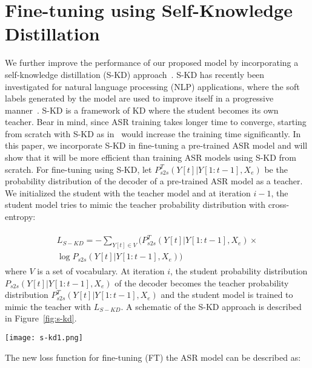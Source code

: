\documentclass{article}
\begin{document}
\section{Fine-tuning using Self-Knowledge Distillation}
We further improve the performance of our proposed model by incorporating a self-knowledge distillation (S-KD) approach~\citep{selfkdgeneralization}. S-KD has recently been investigated for natural language processing (NLP) applications, where the soft labels generated by the model are used to improve itself in a progressive manner~\citep{selfkdnlp, selfkdgeneralization}. S-KD is a framework of KD where the student becomes its own teacher. Bear in mind, since ASR training takes longer time to converge, starting from scratch with S-KD as in~\citep{selfkdgeneralization} would increase the training time significantly. In this paper, we incorporate S-KD in fine-tuning a pre-trained ASR model and will show that it will be more efficient than training ASR models using S-KD from scratch. For fine-tuning using S-KD, let $P^T_{s2s}(Y[t]|Y[1:t-1], X_e)$ be the probability distribution of the decoder of a pre-trained ASR model as a teacher. We initialized the student with the teacher model and at iteration $i-1$, the student model tries to mimic the teacher probability distribution with cross-entropy:

\begin{align}
    \begin{split}
L_{S-KD}=-\sum_{Y[t] \in V} (P^T_{s2s}(Y[t]|Y[1:t-1], X_e) \times\\
\log P_{s2s}(Y[t]|Y[1:t-1], X_e))
    \end{split}
\end{align}
where $V$ is a set of vocabulary. At iteration $i$, the student probability distribution $P_{s2s}(Y[t]|Y[1:t-1], X_e)$ of the decoder becomes the teacher probability distribution $P^T_{s2s}(Y[t]|Y[1:t-1],X_e)$ and the student model is trained to mimic the teacher with $L_{S-KD}$.
A schematic of the S-KD approach is described in Figure~\ref{fig:s-kd}. 
\begin{figure*}[ht]
\vskip 0.2in
\begin{center}
    
    \centerline{\texttt{[image: s-kd1.png]}}
    \caption{Fine-tuning ASR using the S-KD approch. The student at $i-1$ becomes the teacher at iteration $i$ and the model is trained with the loss $L_{ASR-FT}$}
    \label{fig:s-kd}
    \end{center}
    \vskip -0.2in

\end{figure*}
The new loss function for fine-tuning (FT) the ASR model can be described as:    
\end{document}
